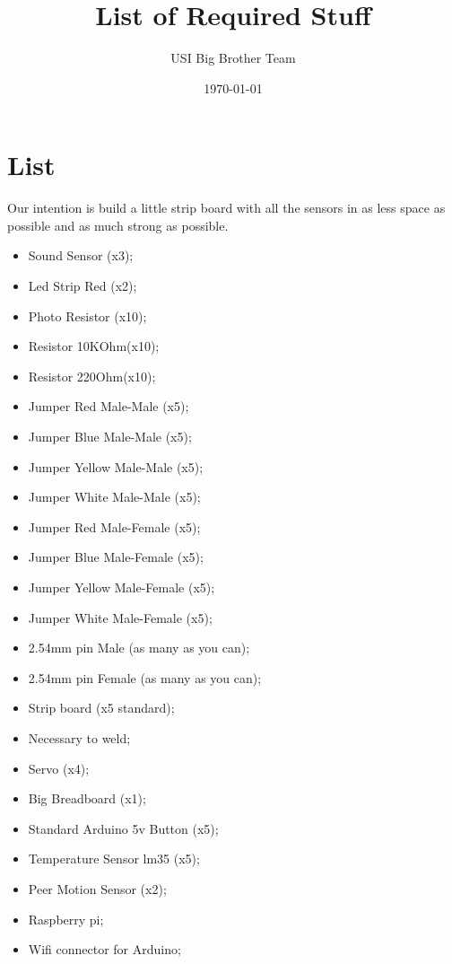 \documentclass[12pt]{article}
\begin{document}
\title{List of Required Stuff}
\author{USI Big Brother Team}
\date{\today}
\maketitle
\section*{List}
Our intention is build a little strip board with all the sensors in as less space as possible and as much strong as possible.
\begin{itemize}
\item Sound Sensor (x3);
\item Led Strip Red (x2);
\item Photo Resistor (x10);
\item Resistor 10KOhm(x10);
\item Resistor 220Ohm(x10);
\item Jumper Red Male-Male (x5);
\item Jumper Blue Male-Male (x5);
\item Jumper Yellow Male-Male (x5);
\item Jumper White Male-Male (x5);
\item Jumper Red Male-Female (x5);
\item Jumper Blue Male-Female (x5);
\item Jumper Yellow Male-Female (x5);
\item Jumper White Male-Female (x5);
\item 2.54mm pin Male (as many as you can);
\item 2.54mm pin Female (as many as you can);
\item Strip board (x5 standard);
\item Necessary to weld;
\item Servo (x4);
\item Big Breadboard (x1);
\item Standard Arduino 5v Button (x5);
\item Temperature Sensor lm35 (x5);
\item Peer Motion Sensor (x2);
\item Raspberry pi;
\item Wifi connector for Arduino;

\end{itemize}
\end{document}
